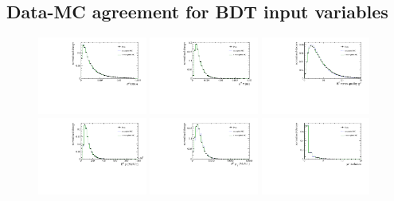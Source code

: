 \clearpage

\subsection{Data-MC agreement for BDT input variables}
\label{sec:appendix:data-mc-bdtvars}
 
\begin{figure}[!hb]
 \centering
 \includegraphics[width=0.32\textwidth]{figs/kpimm/data-mc/bdt/B0_DiraAngle.pdf}
 \includegraphics[width=0.32\textwidth]{figs/kpimm/data-mc/bdt/B0_TAU.pdf}
 \includegraphics[width=0.32\textwidth]{figs/kpimm/data-mc/bdt/B0_ENDVERTEX_CHI2.pdf}
 \includegraphics[width=0.32\textwidth]{figs/kpimm/data-mc/bdt/B0_P.pdf}
 \includegraphics[width=0.32\textwidth]{figs/kpimm/data-mc/bdt/B0_PT.pdf}
 \includegraphics[width=0.32\textwidth]{figs/kpimm/data-mc/bdt/Muplus_isolation_V2_15.pdf}

\end{figure}
